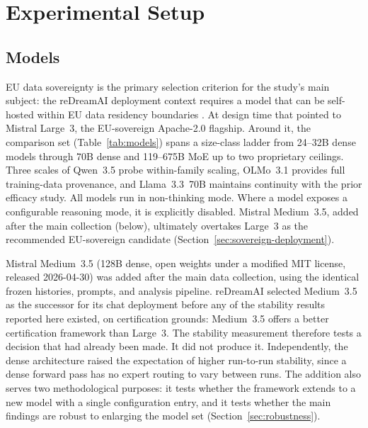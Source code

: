 \section{Experimental Setup}
\label{sec:setup}

\subsection{Models}
\label{sec:models}

EU data sovereignty is the primary selection criterion for the study's main subject: the reDreamAI deployment context requires a model that can be self-hosted within EU data residency boundaries \citep{dale2025sovereign}. At design time that pointed to Mistral Large~3, the EU-sovereign Apache-2.0 flagship. Around it, the comparison set (Table~\ref{tab:models}) spans a size-class ladder from 24--32B dense models through 70B dense and 119--675B MoE up to two proprietary ceilings. Three scales of Qwen~3.5 probe within-family scaling, OLMo~3.1 provides full training-data provenance, and Llama~3.3~70B maintains continuity with the prior efficacy study. All models run in non-thinking mode. Where a model exposes a configurable reasoning mode, it is explicitly disabled. Mistral Medium~3.5, added after the main collection (below), ultimately overtakes Large~3 as the recommended EU-sovereign candidate (Section~\ref{sec:sovereign-deployment}).

Mistral Medium~3.5 (128B dense, open weights under a modified MIT license, released 2026-04-30) was added after the main data collection, using the identical frozen histories, prompts, and analysis pipeline. reDreamAI selected Medium~3.5 as the successor for its chat deployment before any of the stability results reported here existed, on certification grounds: Medium~3.5 offers a better certification framework than Large~3. The stability measurement therefore tests a decision that had already been made. It did not produce it. Independently, the dense architecture raised the expectation of higher run-to-run stability, since a dense forward pass has no expert routing to vary between runs. The addition also serves two methodological purposes: it tests whether the framework extends to a new model with a single configuration entry, and it tests whether the main findings are robust to enlarging the model set (Section~\ref{sec:robustness}).

